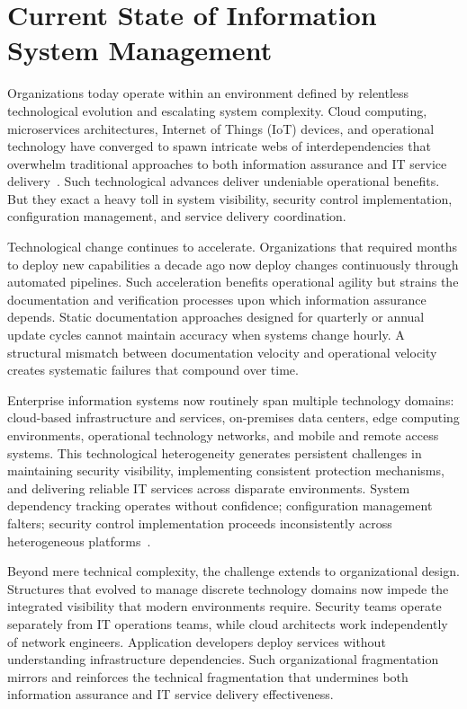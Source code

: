 \section{Current State of Information System Management}

Organizations today operate within an environment defined by relentless technological evolution and escalating system complexity. Cloud computing, microservices architectures, Internet of Things (IoT) devices, and operational technology have converged to spawn intricate webs of interdependencies that overwhelm traditional approaches to both information assurance and IT service delivery~\parencite{Benbya_Nan_Tanriverdi_Yoo_2020}. Such technological advances deliver undeniable operational benefits. But they exact a heavy toll in system visibility, security control implementation, configuration management, and service delivery coordination.

Technological change continues to accelerate. Organizations that required months to deploy new capabilities a decade ago now deploy changes continuously through automated pipelines. Such acceleration benefits operational agility but strains the documentation and verification processes upon which information assurance depends. Static documentation approaches designed for quarterly or annual update cycles cannot maintain accuracy when systems change hourly. A structural mismatch between documentation velocity and operational velocity creates systematic failures that compound over time.

Enterprise information systems now routinely span multiple technology domains: cloud-based infrastructure and services, on-premises data centers, edge computing environments, operational technology networks, and mobile and remote access systems. This technological heterogeneity generates persistent challenges in maintaining security visibility, implementing consistent protection mechanisms, and delivering reliable IT services across disparate environments. System dependency tracking operates without confidence; configuration management falters; security control implementation proceeds inconsistently across heterogeneous platforms~\parencite{Bokan_Santos_2021}.

Beyond mere technical complexity, the challenge extends to organizational design. Structures that evolved to manage discrete technology domains now impede the integrated visibility that modern environments require. Security teams operate separately from IT operations teams, while cloud architects work independently of network engineers. Application developers deploy services without understanding infrastructure dependencies. Such organizational fragmentation mirrors and reinforces the technical fragmentation that undermines both information assurance and IT service delivery effectiveness.

